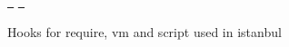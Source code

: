 \href{https://greenkeeper.io/}{\texttt{ }} \href{https://travis-ci.org/istanbuljs/istanbul-lib-hook}{\texttt{ }}

Hooks for require, vm and script used in istanbul 
